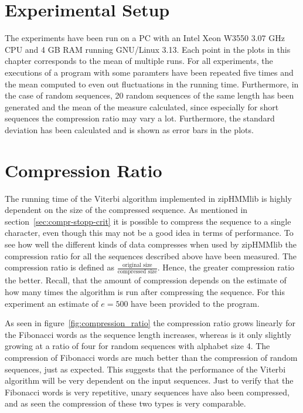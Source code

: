 \section{Experimental Setup}

The experiments have been run on a PC with an Intel Xeon W3550 $3.07$ GHz CPU
and 4 GB RAM running GNU/Linux 3.13. Each point in the plots in this chapter
corresponds to the mean of multiple runs. For all experiments, the executions
of a program with some paramters have been repeated five times and the mean
computed to even out fluctuations in the running time. Furthermore, in the case
of random sequences, 20 random sequences of the same length has been generated
and the mean of the measure calculated, since especially for short sequences
the compression ratio may vary a lot. Furthermore, the standard deviation has
been calculated and is shown as error bars in the plots.

\section{Compression Ratio} 
\label{sec:compression-ratio}

The running time of the Viterbi algorithm implemented in zipHMMlib is highly
dependent on the size of the compressed sequence. As mentioned in
section~\ref{sec:compr-stopp-crit} it is possible to compress the sequence to a
single character, even though this may not be a good idea in terms of
performance. To see how well the different kinds of data compresses when used
by zipHMMlib the compression ratio for all the sequences described above have
been measured. The compression ratio is defined as
$\frac{\text{original size}}{\text{compressed size}}$. Hence, the greater
compression ratio the better. Recall, that the amount of compression depends on
the estimate of how many times the algorithm is run after compressing the
sequence. For this experiment an estimate of $e = 500$ have been provided to
the program.

As seen in figure~\ref{fig:compression_ratio} the compression ratio grows
linearly for the Fibonacci words as the sequence length increases, whereas is
it only slightly growing at a ratio of four for random
sequences with alphabet size 4. The compression of Fibonacci words are much
better than the compression of random sequences, just as expected. This
suggests that the performance of the Viterbi algorithm will be very dependent
on the input sequences. Just to verify that the Fibonacci words is very
repetitive, unary sequences have also been compressed, and as seen the
compression of these two types is very comparable.


